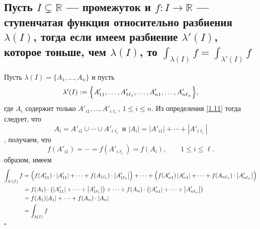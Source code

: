 \documentclass[a4paper]{article}
\newcommand{\qed}{\hfill$\square$}
\begin{document}
\subsection{Пусть $I\subsetneq\mathbb{R}$ — промежуток и $f:I\rightarrow\mathbb{R}$ — ступенчатая функция относительно разбиения $\lambda(I)$, тогда если имеем разбиение $\lambda'(I)$, которое тоньше, чем $\lambda(I)$, то $\displaystyle\int_{\lambda(I)}f=\int_{\lambda'(I)}f$}
Пусть $\lambda(I) = \{ A_1,\ldots, A_n \}$ и пусть 
$$
\lambda'(I) : = \Bigl\{A_{11}', \ldots, A'_{1\ell_1},\ldots, A'_{n1},\ldots, A'_{n\ell_n} \Bigr\},
$$
где $A_i$ содержит только $A'_{i1},\ldots, A'_{i\ell_i}$, $1\leqslant i \leqslant n$. Из определения \ref{1.11} тогда следует, что $$A_i = A'_{i1} \cup \cdots \cup A'_{i\ell_i}\text{ и }|A_i| = |A'_{i1}| + \cdots + |A'_{i\ell_i}|$$
, получаем, что
$$
f(A'_{i1}) = \cdots = f(A'_{i\ell_i}) = f(A_i), \qquad 1 \leqslant i \leqslant \ell.
$$
 образом, имеем
$$\begin{aligned}
\int_{\lambda'(I)}f &= \Bigl(f(A_{11}') \cdot \left| A'_{11} \right| + \cdots + f(A_{1\ell_1})\cdot \left|A'_{1\ell_1}\right|\Bigr) + \cdots + \Bigl(f(A_{n1}') \left|A_{n1}'\right| + \cdots + f(A_{n\ell_n})\cdot \left|A'_{n\ell_n}\right| \Bigr) \\
&= f(A_1) \cdot \left( \left| A'_{11}  \right| + \cdots + \left| A'_{1\ell_1} \right| \right) + \cdots + f(A_n) \cdot \left( \left| A'_{n1}  \right| + \cdots + \left| A'_{n\ell_n} \right| \right) \\
&= f(A_1) |A_1| + \cdots + f(A_n)\cdot |A_n| \\
&= \int_{\lambda(I)}f
\end{aligned}$$\qed
\end{document}
